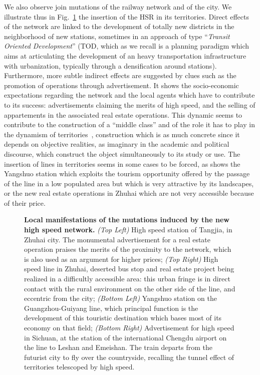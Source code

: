 We also observe join mutations of the railway network and of the city. We illustrate thus in Fig.~\ref{fig:qualitative:hsr} the insertion of the HSR in its territories. Direct effects of the network are linked to the development of totally new districts in the neighborhood of new stations, sometimes in an approach of type ``\emph{Transit Oriented Development}'' (TOD, which as we recall is a planning paradigm which aims at articulating the development of an heavy transportation infrastructure with urbanization, typically through a densification around stations). Furthermore, more subtle indirect effects are suggested by clues such as the promotion of operations through advertisement. It shows the socio-economic expectations regarding the network and the local agents which have to contribute to its success: advertisements claiming the merits of high speed, and the selling of appartements in the associated real estate operations. This dynamic seems to contribute to the construction of a ``middle class'' and of the role it has to play in the dynamism of territories~\citep{rocca2008power}, construction which is as much concrete since it depends on objective realities, as imaginary in the academic and political discourse, which construct the object simultaneously to its study or use. The insertion of lines in territories seems in some cases to be forced, as shows the Yangshuo station which exploits the tourism opportunity offered by the passage of the line in a low populated area but which is very attractive by its landscapes, or the new real estate operations in Zhuhai which are not very accessible because of their price.


\begin{figure}
	\caption{\textbf{Local manifestations of the mutations induced by the new high speed network.} \textit{(Top Left)} High speed station of Tangjia, in Zhuhai city. The monumental advertisement for a real estate operation praises the merits of the proximity to the network, which is also used as an argument for higher prices; \textit{(Top Right)} High speed line in Zhuhai, deserted bus stop and real estate project being realized in a difficultly accessible area: this urban fringe is in direct contact with the rural environment on the other side of the line, and eccentric from the city; \textit{(Bottom Left)} Yangshuo station on the Guangzhou-Guiyang line, which principal function is the development of this touristic destination which bases most of its economy on that field; \textit{(Bottom Right)} Advertisement for high speed in Sichuan, at the station of the international Chengdu airport on the line to Leshan and Emeishan. The train departs from the futurist city to fly over the countryside, recalling the tunnel effect of territories telescoped by high speed.\label{fig:qualitative:hsr}}
\end{figure}


